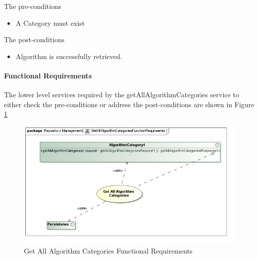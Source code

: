 The pre-conditions
\begin{itemize}
  \item A Category must exist
\end{itemize}

The post-conditions
\begin{itemize}
  \item Algorithm is successfully retrieved.
\end{itemize}

\paragraph{Functional Requirements}
The lower level services required by the getAllAlgorithmCategories service to either check the
pre-conditions or address the post-conditions are shown in Figure \ref{fig:getAllAlgorithmCategoriesFR}
\begin{figure}[H]
  \begin{center}
  \includegraphics[scale=0.6]{../Diagrams and Charts/Test Data/GetAllAlgorithmCategoriesFunctionRequirments.jpg}
  \caption{Get All Algorithm Categories Functional Requirements}
  \label{fig:getAllAlgorithmCategoriesFR}
  \end{center}
\end{figure}







